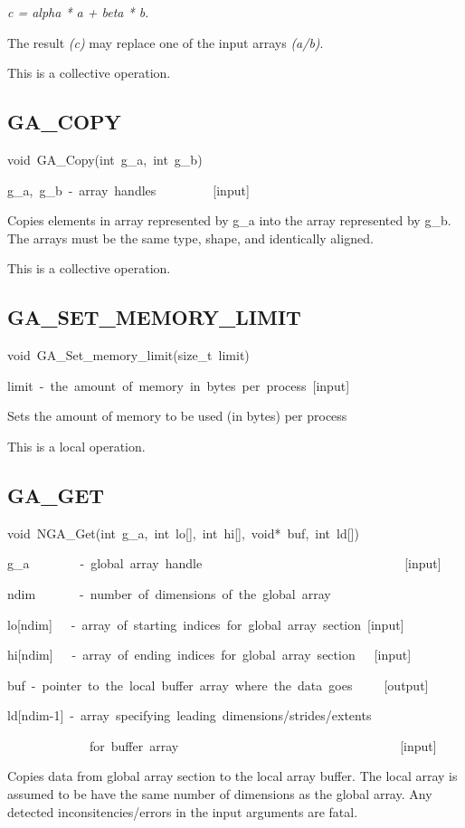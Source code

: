 \emph{c = alpha {*} a + beta {*} b.}

The result \emph{(c)} may replace one of the input arrays \emph{(a/b)}.

This is a collective operation. 


\subsection*{\label{sub:GA_COPY}GA\_COPY}
\begin{lyxcode}
void~GA\_Copy(int~g\_a,~int~g\_b)



g\_a,~g\_b~-~array~handles~~~~~~~~~{[}input{]}
\end{lyxcode}
Copies elements in array represented by g\_a into the array represented
by g\_b. The arrays must be the same type, shape, and identically
aligned.

This is a collective operation.


\subsection*{\label{sub:GA_SET_MEMORY_LIMIT}GA\_SET\_MEMORY\_LIMIT}
\begin{lyxcode}
void~GA\_Set\_memory\_limit(size\_t~limit)



limit~-~the~amount~of~memory~in~bytes~per~process~{[}input{]}
\end{lyxcode}
Sets the amount of memory to be used (in bytes) per process

This is a local operation.


\subsection*{\label{sub:GA_GET}GA\_GET}
\begin{lyxcode}
void~NGA\_Get(int~g\_a,~int~lo{[}{]},~int~hi{[}{]},~void{*}~buf,~int~ld{[}{]})



g\_a~~~~~~~~-~global~array~handle~~~~~~~~~~~~~~~~~~~~~~~~~~~~~~~~{[}input{]}~

ndim~~~~~~~-~number~of~dimensions~of~the~global~array~

lo{[}ndim{]}~~~-~array~of~starting~indices~for~global~array~section~{[}input{]}

hi{[}ndim{]}~~~-~array~of~ending~indices~for~global~array~section~~~{[}input{]}

buf~-~pointer~to~the~local~buffer~array~where~the~data~goes~~~~~{[}output{]}

ld{[}ndim-1{]}~-~array~specifying~leading~dimensions/strides/extents~

~~~~~~~~~~~~~for~buffer~array~~~~~~~~~~~~~~~~~~~~~~~~~~~~~~~~~~~{[}input{]}
\end{lyxcode}
Copies data from global array section to the local array buffer. The
local array is assumed to be have the same number of dimensions as
the global array. Any detected inconsitencies/errors in the input
arguments are fatal.

